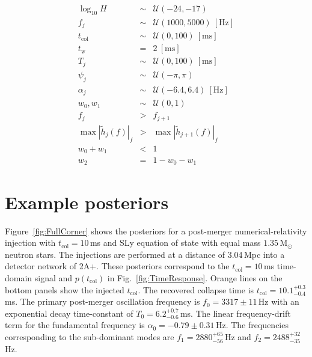 \documentclass[
reprint,
prd,
twocolumn,
nofootinbib,
tightenlines %
floatfix,
 amsmath,
showpacs ,amssymb, aps,%
superscriptaddress
]{revtex4-1}
\newcommand{\tc}{t_{\mathrm{col}}}
\newcommand{\tw}{t_{\mathrm{w}}}
\newcommand{\msun}{\mathrm{M}_{\odot}}
\begin{document}
    \begin{eqnarray}
        \log_{10}{H} & \sim & \mathcal{U}(-24, -17)\label{eq:firstprior}  \\
        f_j & \sim & \mathcal{U}(1000,5000)\  [\mathrm{Hz}]\\
        \tc & \sim & \mathcal{U}(0,100)\  [\mathrm{ms}]\\
        \tw & = & 2\  [\mathrm{ms}]\\
        T_j & \sim & \mathcal{U}(0,100)\ [\mathrm{ms}]\\
        \psi_j & \sim & \mathcal{U}(-\pi,\pi) \\
        \alpha_j & \sim & \mathcal{U}(-6.4,6.4)\   [\mathrm{Hz}] \\
        w_0, w_1 & \sim & \mathcal{U}(0,1)\label{eq:lastprior}\\
        f_{j}  & > & f_{j+1}\label{eq:freqsorting}\\
        \max|\tilde{h}_{j}(f)|_f & > & \max|\tilde{h}_{j+1}(f)|_f \label{eq:modesorting}\\
        w_0+w_1 & < & 1  \label{eq:w01}\\
        w_2 & = & 1 - w_0 - w_1 \label{eq:w2}
    \end{eqnarray}
    \onecolumngrid
    \vfill\null 
    \pagebreak
    
\section{Example posteriors}
\label{appendix:b}
    \vspace{-0.3cm}
    Figure~\ref{fig:FullCorner} shows the posteriors for a post-merger numerical-relativity injection with $\tc=10\,$ms and SLy equation of state with equal mass $1.35\,\msun$ neutron stars. The injections are performed at a distance of 3.04\,Mpc into a detector network of 2A+.
    These posteriors correspond to the $\tc=10\,$ms time-domain signal and $p(\tc)$ in Fig.~\ref{fig:TimeResponse}.
    Orange lines on the bottom panels show the injected $\tc$.
    The recovered collapse time is $\tc=10.1^{+0.3}_{-0.4}\,$ms. 
    The primary post-merger oscillation frequency is $f_0=3317\pm 11\,$Hz with an exponential decay time-constant of $T_0=6.2_{-0.6}^{+ 0.7}\,$ms. 
    The linear frequency-drift term for the fundamental frequency is $\alpha_0=-0.79\pm 0.31\,$Hz. The frequencies corresponding to the sub-dominant modes are $f_1=2880^{+65}_{-56}\,$Hz and $f_2=2488^{+32}_{-35}\,$Hz. 
\end{document}

